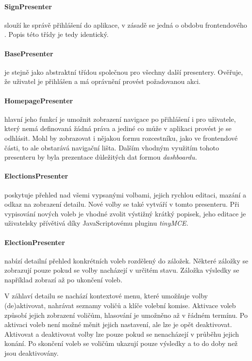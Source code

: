 \paragraph{SignPresenter} slouží ke správě přihlášení do aplikace, v zásadě se jedná o obdobu frontendového . Popis této třídy je tedy identický.


\paragraph{BasePresenter} je stejně jako  abstraktní třídou společnou pro všechny další presentery. Ověřuje, že uživatel je přihlášen a má oprávnění provést požadovanou akci.


\paragraph{HomepagePresenter} hlavní jeho funkcí je umožnit zobrazení navigace po přihlášení i pro uživatele, který nemá definovaná žádná práva a jediné co může v aplikaci provést je se odhlásit. Mohl by zobrazovat i nějakou formu rozcestníku, jako ve frontendové části, to ale obstarává navigační lišta. Dalším vhodným využitím tohoto presenteru by byla prezentace důležitých dat formou \it{dashboardu}.


\paragraph{ElectionsPresenter} poskytuje přehled nad všemi vypsanými volbami, jejich rychlou editaci, mazání a odkaz na zobrazení detailu. Nové volby se také vytváří v tomto presenteru. Při vypisování nových voleb je vhodné zvolit výstižný krátký popisek, jeho editace je uživatelsky přívětivá díky JavaScriptovému pluginu \it{tinyMCE}.


\paragraph{ElectionPresenter} nabízí detailní přehled konkrétních voleb rozdělený do záložek. Některé záložky se zobrazují pouze pokud se volby nacházejí v určitém stavu. Záložka výsledky se například zobrazí až po ukončení voleb. 

V záhlaví detailu se nachází kontextové menu, které umožňuje volby (de)aktivovat, nahrávat seznamy voličů a klíče volební komise. Aktivace voleb způsobí jejich zobrazení voličům, hlasování je umožněno až v řádném termínu. Po aktivaci voleb není možné měnit jejich nastavení, ale lze je opět deaktivovat. Aktivovat a deaktivovat volby lze pouze pokud se nenacházejí v průběhu jejich konání. Po skončení voleb se voličům ukazují pouze výsledky a to do doby než jsou deaktivovány.

